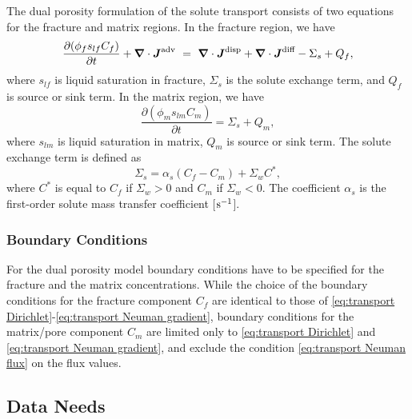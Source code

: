 The dual porosity formulation of the solute transport consists of two equations
for the fracture and matrix regions. 
In the fracture region, we have \citep{simunek-vangenuchten_2008}
\begin{equation}  \label{eq:MassConservation}
  \frac{\partial (\phi_f s_{lf} C_f)}{\partial t} 
  + 
  {\boldsymbol{\nabla}} \cdot {\boldsymbol{J}}^\text{adv} \ =\  {\boldsymbol{\nabla}} \cdot {\boldsymbol{J}}^\text{disp} 
  + 
  {\boldsymbol{\nabla}} \cdot {\boldsymbol{J}}^\text{diff} - \Sigma_s + Q_f,
\end{equation}
where $s_{lf}$ is liquid saturation in fracture, 
$\Sigma_s$ is the solute exchange term,
and $Q_f$ is source or sink term.
In the matrix region, we have
$$
  \frac{\partial (\phi_m s_{lm} C_m)}{\partial t}
  = \Sigma_s + Q_m,
$$
where $s_{lm}$ is liquid saturation in matrix, $Q_m$ is source or sink term.
The solute exchange term is defined as
$$
  \Sigma_s = \alpha_s (C_f - C_m) + \Sigma_w C^*,
$$
where $C^*$ is equal to $C_f$ if $\Sigma_w > 0$ and $C_m$ if $\Sigma_w < 0$.
The coefficient $\alpha_s$ is the first-order solute mass transfer coefficient [${\rm s}^{-1}$].



\subsubsection{Boundary Conditions} 
\label{sec:transport-boundary-conditions-dual-porosity}

\noindent 
For the dual porosity model boundary conditions have to be specified 
for the fracture and the matrix concentrations.
While the choice of the boundary conditions for the fracture component $C_f$ 
are identical to those of \eqref{eq:transport Dirichlet}-\eqref{eq:transport Neuman gradient},
boundary conditions for the matrix/pore component $C_m$
are limited only to  \eqref{eq:transport Dirichlet} and 
\eqref{eq:transport Neuman gradient}, and exclude the condition \eqref{eq:transport Neuman flux}
on the flux values.






\subsection{Data Needs}

